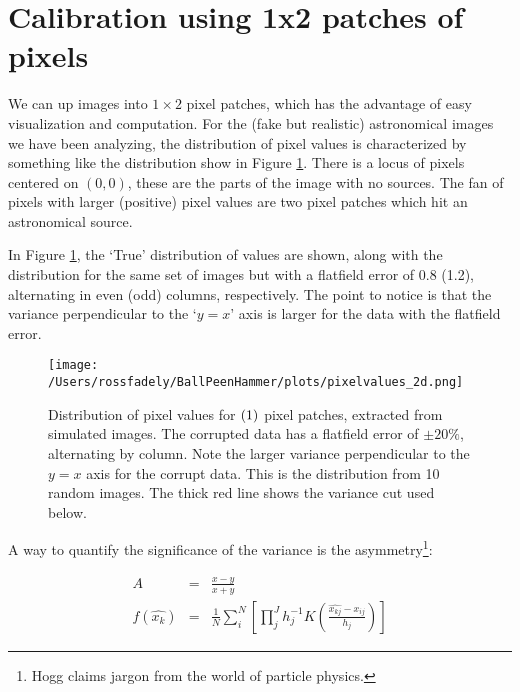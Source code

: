 \documentclass[12pt,preprint,pdftex]{aastex}
\begin{document}
\sloppy\sloppypar



\section{Calibration using 1x2 patches of pixels}

We can up images into $1\times2$ pixel patches, which has the advantage of easy 
visualization and computation.  For the (fake but realistic) astronomical images we 
have been analyzing, the distribution of pixel values is characterized by something 
like the distribution show in Figure \ref{fig:fig1}.  There is a locus of pixels centered on 
$(0,0)$, these are the parts of the image with no sources.  The fan of pixels with larger 
(positive) pixel values are two pixel patches which hit an astronomical source.  

In Figure \ref{fig:fig1}, the `True' distribution of values are shown, along with the distribution 
for the same set of images but with a flatfield error of 0.8 (1.2), alternating in even (odd) 
columns, respectively.  The point to notice is that the variance perpendicular to the `$y=x$' 
axis is larger for the data with the flatfield error.

\begin{figure}
\centering
 \texttt{[image: /Users/rossfadely/BallPeenHammer/plots/pixelvalues\_2d.png]}
\caption{Distribution of pixel values for $(1\time2)$ pixel patches, extracted from simulated images.  The corrupted data has a flatfield error of $\pm20\%$, alternating by column.  Note the larger variance perpendicular to the $y=x$ axis for the corrupt data. This is the distribution from 10 random images.  The thick red line shows the variance cut used below.}
\label{fig:fig1}
\end{figure}

A way to quantify the significance of the variance is the asymmetry\footnote{Hogg claims jargon from the world of particle physics.}:

\begin{eqnarray}
A &=& \frac{x-y}{x+y}\\
f(\hat{x_k}) &=& \frac{1}{N}\sum^{N}_i\left[\prod_j^{J} h_j^{-1} K\left(\frac{\hat{x_{kj}}-x_{ij}}{h_j}\right)\right]
\end{eqnarray}
\end{document}
